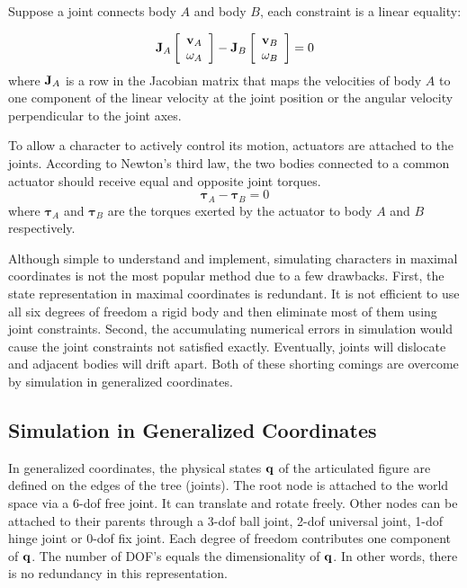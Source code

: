 Suppose a joint connects body $A$ and body $B$, each constraint is a linear equality:

\begin{equation}
\vc{J}_A
\left[\begin{array}{c}
\vc{v}_A \\
\vc{\omega}_A
\end{array}\right]-
\vc{J}_B
\left[\begin{array}{c}
\vc{v}_B \\
\vc{\omega}_B
\end{array}\right]
=0
\label{eq:jointConstraint}
\end{equation}
where $\mathbf{J}_A$ is a row in the Jacobian matrix that maps the velocities of body $A$ to one component of the linear velocity at the joint position or the angular velocity perpendicular to the joint axes.

To allow a character to actively control its motion, actuators are attached to the joints. According to Newton's third law, the two bodies connected to a common actuator should receive equal and opposite joint torques.
\begin{equation}
\boldsymbol{\tau}_A-\boldsymbol{\tau}_B=0
\label{eq:actuatorConstraint}
\end{equation}
where $\boldsymbol{\tau}_A$ and $\boldsymbol{\tau}_B$ are the torques exerted by the actuator to body $A$ and $B$ respectively.

Although simple to understand and implement, simulating characters in maximal coordinates is not the most popular method due to a few drawbacks. First, the state representation in  maximal coordinates is redundant. It is not efficient to use all six degrees of freedom a rigid body and then eliminate most of them using joint constraints. Second, the accumulating numerical errors in simulation would cause the joint constraints not satisfied exactly. Eventually, joints will dislocate and adjacent bodies will drift apart. Both of these shorting comings are overcome by simulation in generalized coordinates.

\subsection{Simulation in Generalized Coordinates}
In generalized coordinates, the physical states $\mathbf{q}$ of the articulated figure are defined on the edges of the tree (joints). The root node is attached to the world space via a 6-dof free joint. It can translate and rotate freely. Other nodes can be attached to their parents through a 3-dof ball joint, 2-dof universal joint, 1-dof hinge joint or 0-dof fix joint. Each degree of freedom contributes one component of $\mathbf{q}$. The number of DOF's equals the dimensionality of $\mathbf{q}$. In other words, there is no redundancy in this representation.

